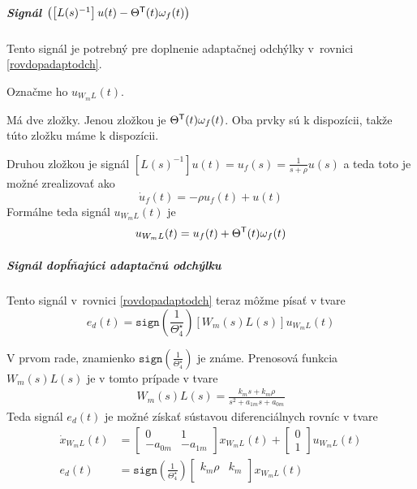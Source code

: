 \documentclass[a4paper, 10pt, ]{article}
\begin{document}
\subparagraph{Signál $\left( \left[L(s)^{-1}\right] u(t) - \Theta^{\mathsf{T}}(t) \omega_f(t) \right)$}

Tento signál je potrebný pre doplnenie adaptačnej odchýlky v~rovnici \eqref{rovdopadaptodch}.

Označme ho $u_{W_mL}(t)$.

Má dve zložky. Jenou zložkou je $\Theta^{\mathsf{T}}(t) \omega_f(t)$. Oba prvky sú k dispozícii, takže túto zložku máme k dispozícii.

Druhou zložkou je signál $\left[L(s)^{-1}\right] u(t) = u_f(s) = \frac{1}{s+\rho} u(s)$ a teda toto je možné zrealizovať ako
\begin{equation}
    \dot u_f(t) = -\rho u_f(t) + u(t)
\end{equation}
Formálne teda signál $u_{W_mL}(t)$ je
\begin{equation}
    u_{W_mL}(t) = u_f(t) + \Theta^{\mathsf{T}}(t) \omega_f(t)
\end{equation}





\subparagraph{Signál dopĺňajúci adaptačnú odchýlku}

Tento signál v~rovnici \eqref{rovdopadaptodch} teraz môžme písať v tvare
\begin{equation}
	e_d(t) =  \texttt{sign}\left(\frac{1}{\Theta_4^\star}\right) \left[ W_m(s) L(s) \right]  u_{W_mL}(t)
\end{equation}

V prvom rade, znamienko $\texttt{sign}\left(\frac{1}{\Theta_4^\star}\right)$ je známe. Prenosová funkcia $W_m(s) L(s)$ je v tomto prípade v tvare
\begin{align}
    W_m(s) L(s) = \frac{ k_m s + k_m \rho }{ s^2 + a_{1m}s + a_{0m} }
\end{align}
Teda signál $e_d(t)$ je možné získať sústavou diferenciálnych rovníc v tvare
\begin{align}
	\dot x_{W_mL}(t)
	&=
	\begin{bmatrix}
    	0 & 1 \\
    	- a_{0m} & - a_{1m}
  	\end{bmatrix}
    x_{W_mL}(t)
    +
    \begin{bmatrix}
    	  0 \\
		  1
 	\end{bmatrix}
    u_{W_mL}(t)
    \\
    e_d(t)
    &=
    \texttt{sign}\left(\frac{1}{\Theta_4^\star}\right)
    \begin{bmatrix}
        k_m \rho & k_m \\
    \end{bmatrix}
    x_{W_mL}(t)
\end{align}
\end{document}
